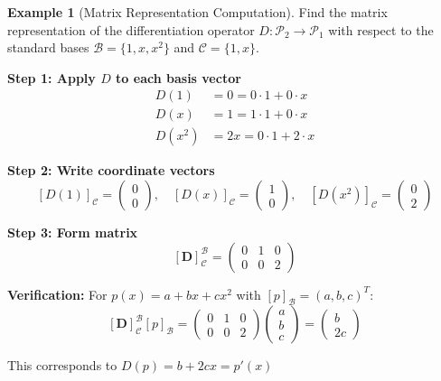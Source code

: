 \documentclass[12pt]{article}
\numberwithin{equation}{section}
\newcommand{\mat}[1]{\mathbf{#1}}        %
\theoremstyle{plain}
\theoremstyle{definition}
\newtheorem{example}[theorem]{Example}
\theoremstyle{remark}
\begin{document}
\begin{example}[Matrix Representation Computation]
Find the matrix representation of the differentiation operator $D: \mathcal{P}_2 \to \mathcal{P}_1$ with respect to the standard bases $\mathcal{B} = \{1, x, x^2\}$ and $\mathcal{C} = \{1, x\}$.

\textbf{Step 1: Apply $D$ to each basis vector}
\begin{align}
D(1) &= 0 = 0 \cdot 1 + 0 \cdot x \\
D(x) &= 1 = 1 \cdot 1 + 0 \cdot x \\
D(x^2) &= 2x = 0 \cdot 1 + 2 \cdot x
\end{align}

\textbf{Step 2: Write coordinate vectors}
$$[D(1)]_{\mathcal{C}} = \begin{pmatrix} 0 \\ 0 \end{pmatrix}, \quad [D(x)]_{\mathcal{C}} = \begin{pmatrix} 1 \\ 0 \end{pmatrix}, \quad [D(x^2)]_{\mathcal{C}} = \begin{pmatrix} 0 \\ 2 \end{pmatrix}$$

\textbf{Step 3: Form matrix}
$$[\mat{D}]_{\mathcal{C}}^{\mathcal{B}} = \begin{pmatrix} 0 & 1 & 0 \\ 0 & 0 & 2 \end{pmatrix}$$

\textbf{Verification:} For $p(x) = a + bx + cx^2$ with $[p]_{\mathcal{B}} = (a, b, c)^T$:
$$[\mat{D}]_{\mathcal{C}}^{\mathcal{B}} [p]_{\mathcal{B}} = \begin{pmatrix} 0 & 1 & 0 \\ 0 & 0 & 2 \end{pmatrix}\begin{pmatrix} a \\ b \\ c \end{pmatrix} = \begin{pmatrix} b \\ 2c \end{pmatrix}$$

This corresponds to $D(p) = b + 2cx = p'(x)$ \checkmark
\end{example}

\end{document}
